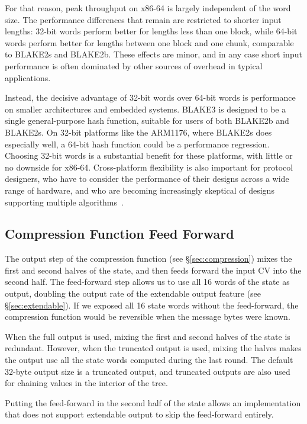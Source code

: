 \documentclass[11pt,notitlepage,a4paper]{article}
\begin{document}
For that reason, peak throughput on x86-64 is largely independent of the word
size. The performance differences that remain are restricted to shorter input
lengths: 32-bit words perform better for lengths less than one block, while
64-bit words perform better for lengths between one block and one chunk,
comparable to BLAKE2s and BLAKE2b. These effects are minor, and in any case
short input performance is often dominated by other sources of overhead in
typical applications.

Instead, the decisive advantage of 32-bit words over 64-bit words is
performance on smaller architectures and embedded systems. BLAKE3 is designed to
be a single general-purpose hash function, suitable for users of both BLAKE2b
and BLAKE2s. On 32-bit platforms like the ARM1176, where BLAKE2s does
especially well, a 64-bit hash function could be a performance regression.
Choosing 32-bit words is a substantial benefit for these platforms, with little
or no downside for x86-64. Cross-platform flexibility is also important for
protocol designers, who have to consider the performance of their designs
across a wide range of hardware, and who are becoming increasingly skeptical of
designs supporting multiple algorithms~\cite{WG}.

\subsection{Compression Function Feed Forward}\label{sec:feedforward}

The output step of the compression function (see \S\ref{sec:compression}) mixes
the first and second halves of the state, and then feeds forward the input CV
into the second half. The feed-forward step allows us to use all 16 words of
the state as output, doubling the output rate of the extendable output feature
(see \S\ref{sec:extendable}). If we exposed all 16 state words without the
feed-forward, the compression function would be reversible when the message
bytes were known.

When the full output is used, mixing the first and second halves of the state
is redundant. However, when the truncated output is used, mixing the halves
makes the output use all the state words computed during the last round. The
default 32-byte output size is a truncated output, and truncated outputs are
also used for chaining values in the interior of the tree.

Putting the feed-forward in the second half of the state allows an
implementation that does not support extendable output to skip the feed-forward
entirely.
\end{document}
